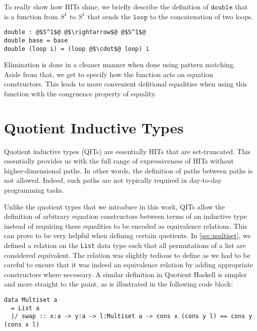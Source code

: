 \documentclass[12pt,twoside,maitrise]{dms}
\theoremstyle{definition}
\numberwithin{equation}{section}
\numberwithin{table}{chapter}
\numberwithin{figure}{chapter}
\newcommand\id[1] {\texttt{#1}}
\begin{document}
To really show how HITs shine, we briefly describe the definition of $\id{double}$ that is a function from $S^1$ to $S^1$ that sends the $\id{loop}$ to the concatenation of two
loops.

\begin{verbatim}
double : @$S^1$@ @$\rightarrow$@ @$S^1$@
double base = base
double (loop i) = (loop @$\cdot$@ loop) i
\end{verbatim}

Elimination is done in a cleaner manner when done using pattern matching. Aside
from that, we get to specify how the function acts on equation constructors.
This leads to more convenient defitional equalities when using this function
with the congruence property of equality.

\section{Quotient Inductive Types}\label{sec:related-qit}

Quotient inductive types (QITs) are essentially HITs that are set-truncated.
This essentially provides us with the full range of expressiveness of HITs
without higher-dimensional paths. In other words, the definition of paths
between paths is not allowed. Indeed, such paths are not typically required in
day-to-day programming tasks.

Unlike the quotient types that we introduce in this work, QITs allow the
definition of arbitrary equation constructors between terms of an inductive type
instead of requiring these equalities to be encoded as equivalence relations.
This can prove to be very helpful when defining certain quotients. In
\autoref{sec:multiset}, we defined a relation on the \id{List} data type such
that all permutations of a list are considered equivalent. The relation was
slightly tedious to define as we had to be careful to ensure that it was indeed
an equivalence relation by adding appropriate constructors where necessary. A similar
definition in Quotient Haskell\cite{hewer2023quotient} is simpler and more straight
to the point, as is illustrated in the following code block:

\begin{verbatim}
data Multiset a
  = List a
  |/ swap :: x:a -> y:a -> l:Multiset a -> cons x (cons y l) == cons y (cons x l)
\end{verbatim}
\end{document}

